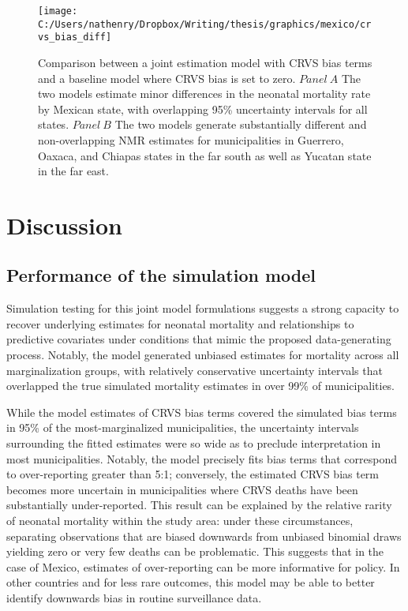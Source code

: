 \documentclass[
]{article}
\begin{document}
\begin{figure}[!p]

{\centering \texttt{[image: C:/Users/nathenry/Dropbox/Writing/thesis/graphics/mexico/crvs\_bias\_diff]} 

}

\caption{Comparison between a joint estimation model with CRVS bias terms and a baseline model where CRVS bias is set to zero. \(Panel\ A\) The two models estimate minor differences in the neonatal mortality rate by Mexican state, with overlapping 95\% uncertainty intervals for all states. \(Panel\ B\) The two models generate substantially different and non-overlapping NMR estimates for municipalities in Guerrero, Oaxaca, and Chiapas states in the far south as well as Yucatan state in the far east.}\label{fig:crvs-bias-diff}
\end{figure}

\hypertarget{discussion}{%
\section{Discussion}\label{discussion}}

\hypertarget{performance-of-the-simulation-model}{%
\subsection{Performance of the simulation model}\label{performance-of-the-simulation-model}}

Simulation testing for this joint model formulations suggests a strong capacity to recover underlying estimates for neonatal mortality and relationships to predictive covariates under conditions that mimic the proposed data-generating process. Notably, the model generated unbiased estimates for mortality across all marginalization groups, with relatively conservative uncertainty intervals that overlapped the true simulated mortality estimates in over 99\% of municipalities.

While the model estimates of CRVS bias terms covered the simulated bias terms in 95\% of the most-marginalized municipalities, the uncertainty intervals surrounding the fitted estimates were so wide as to preclude interpretation in most municipalities. Notably, the model precisely fits bias terms that correspond to over-reporting greater than 5:1; conversely, the estimated CRVS bias term becomes more uncertain in municipalities where CRVS deaths have been substantially under-reported. This result can be explained by the relative rarity of neonatal mortality within the study area: under these circumstances, separating observations that are biased downwards from unbiased binomial draws yielding zero or very few deaths can be problematic. This suggests that in the case of Mexico, estimates of over-reporting can be more informative for policy. In other countries and for less rare outcomes, this model may be able to better identify downwards bias in routine surveillance data.
\end{document}
